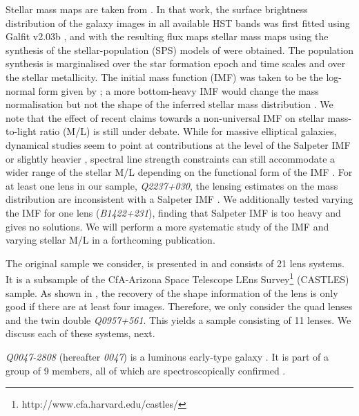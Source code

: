 \documentclass[useAMS,usenatbib]{mn2e}
\begin{document}
Stellar mass maps are taken from \citet{2011ApJ...740...97L}. In that work, the surface brightness distribution of the galaxy images in all available HST bands was first fitted using {\sc Galfit v2.03b} \citep{2002AJ....124..266P}, and with the resulting flux maps stellar mass maps using the synthesis of the stellar-population (SPS) models of \citet{2003MNRAS.344.1000B} were obtained. The population synthesis is marginalised over the star formation epoch and time scales and over the stellar metallicity. The initial mass function (IMF) was taken to be the log-normal form given by \citet{2003PASP..115..763C}; a more bottom-heavy IMF would change the mass normalisation \citep[cf.][]{2014ApJ...793...96S} but not the shape of the inferred stellar mass distribution \citep[unless the IMF presents significant intrinsic deviations locally, see e.g.][]{2015MNRAS.447.1033M}. We note that the effect of recent claims towards a non-universal IMF on stellar mass-to-light ratio (M/L) is still under debate. While for massive elliptical galaxies, dynamical studies seem to point at contributions at the level of the Salpeter IMF or slightly heavier \citep{2013MNRAS.432.1862C}, spectral line strength constraints can still accommodate a wider range of the stellar M/L depending on the functional form of the IMF \citep{2013MNRAS.429L..15F}. For at least one lens in our sample, \textit{Q2237+030}, the lensing estimates on the mass distribution are inconsistent with a Salpeter IMF \citep{2010MNRAS.409L..30F}. We additionally tested varying the IMF for one lens ({\it B1422+231}), finding that Salpeter IMF is too heavy and gives no solutions. We will perform a more systematic study of the IMF and varying stellar M/L in a forthcoming publication.

The original sample we consider, is presented in \citet{2011ApJ...740...97L} and consists of 21 lens systems. It is a subsample of the CfA-Arizona Space Telescope LEns Survey\footnote{http://www.cfa.harvard.edu/castles/} (CASTLES) sample. As shown in \citet{2014MNRAS.445.2181C}, the recovery of the shape information of the lens is only good if there are at least four images. Therefore, we only consider the quad lenses and the twin double \textit{Q0957+561}. This yields a sample consisting of 11 lenses. We discuss each of these systems, next.

\textit{Q0047-2808} (hereafter \textit{0047}) is a luminous early-type galaxy \citep{1996MNRAS.278..139W}. It is part of a group of 9 members, all of which are spectroscopically confirmed \citep{2011ApJ...726...84W}.
\end{document}
